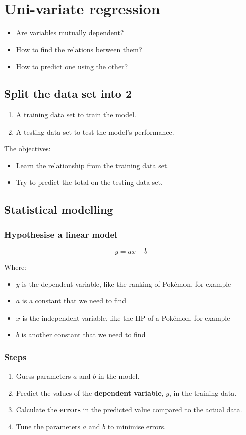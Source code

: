 \documentclass[11pt]{article}
\begin{document}
 \newpage
\section{Uni-variate regression}
\label{sec:org740a94b}
\begin{itemize}
\item Are variables mutually dependent?
\item How to find the relations between them?
\item How to predict one using the other?
\end{itemize}
\subsection{Split the data set into 2}
\label{sec:org2a06bee}
\begin{enumerate}
\item A training data set to train the model.
\item A testing data set to test the model's performance.
\end{enumerate}

The objectives:
\begin{itemize}
\item Learn the relationship from the training data set.
\item Try to predict the total on the testing data set.
\end{itemize}
\subsection{Statistical modelling}
\label{sec:org283063b}

\subsubsection{Hypothesise a linear model}
\label{sec:orgb0bfb0a}
\[y = ax + b\]

Where:
\begin{itemize}
\item \(y\) is the dependent variable, like the ranking of Pokémon, for example
\item \(a\) is a constant that we need to find
\item \(x\) is the independent variable, like the HP of a Pokémon, for example
\item \(b\) is another constant that we need to find
\end{itemize}
\subsubsection{Steps}
\label{sec:org4492e64}
\begin{enumerate}
\item Guess parameters \(a\) and \(b\) in the model.
\item Predict the values of the \textbf{dependent variable}, \(y\), in the training data.
\item Calculate the \textbf{errors} in the predicted value compared to the actual data.
\item Tune the parameters \(a\) and \(b\) to minimise errors.
\end{enumerate}
\end{document}
